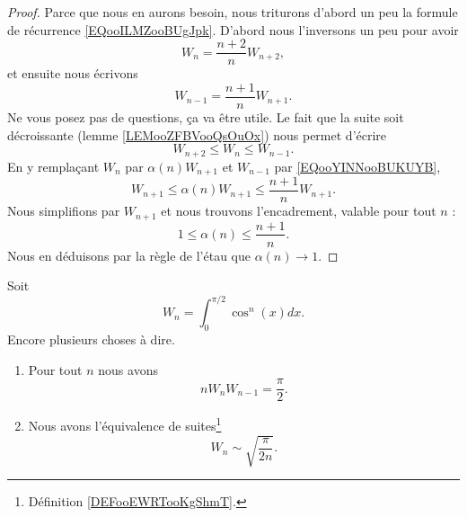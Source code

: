 \begin{proof}
    Parce que nous en aurons besoin, nous triturons d'abord un peu la formule de récurrence \eqref{EQooILMZooBUgJpk}. D'abord nous l'inversons un peu pour avoir
    \begin{equation}
        W_n=\frac{ n+2 }{ n }W_{n+2},
    \end{equation}
    et ensuite nous écrivons
    \begin{equation}        \label{EQooYINNooBUKUYB}
        W_{n-1}=\frac{ n+1 }{ n }W_{n+1}.
    \end{equation}
    Ne vous posez pas de questions, ça va être utile. Le fait que la suite soit décroissante (lemme \ref{LEMooZFBVooQsOuOx}) nous permet d'écrire
    \begin{equation}
        W_{n+2}\leq W_n\leq W_{n-1}.
    \end{equation}
    En y remplaçant \( W_n\) par \( \alpha(n)W_{n+1}\) et \( W_{n-1}\) par \eqref{EQooYINNooBUKUYB},
    \begin{equation}
        W_{n+1}\leq \alpha(n)W_{n+1}\leq \frac{ n+1 }{ n }W_{n+1}.
    \end{equation}
    Nous simplifions par \( W_{n+1}\) et nous trouvons l'encadrement, valable pour tout \( n\) :
    \begin{equation}
        1\leq \alpha(n)\leq \frac{ n+1 }{ n }.
    \end{equation}
    Nous en déduisons par la règle de l'étau que \( \alpha(n)\to 1\).
\end{proof}

\begin{lemma}       \label{LEMooWQZAooOXAPQO}
    Soit
    \begin{equation}
        W_n=\int_0^{\pi/2}\cos^n(x)dx.
    \end{equation}
    Encore plusieurs choses à dire.
    \begin{enumerate}
        \item
            Pour tout \( n\) nous avons
            \begin{equation}        \label{EQooLOLFooMIwMXN}
                nW_nW_{n-1}=\frac{ \pi }{2}.
            \end{equation}
            \item
                Nous avons l'équivalence de suites\footnote{Définition \ref{DEFooEWRTooKgShmT}.}
                \begin{equation}
                    W_n\sim\sqrt{ \frac{ \pi }{ 2n } }.
                \end{equation}
    \end{enumerate}
\end{lemma}

